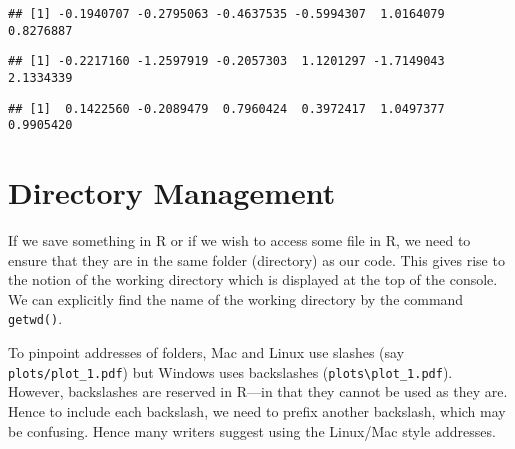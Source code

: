 \documentclass[12pt,]{article}
\newenvironment{Shaded}{\begin{snugshade}}{\end{snugshade}}
\newcommand{\KeywordTok}[1]{\textcolor[rgb]{0.13,0.29,0.53}{\textbf{#1}}}
\newcommand{\DecValTok}[1]{\textcolor[rgb]{0.00,0.00,0.81}{#1}}
\newcommand{\StringTok}[1]{\textcolor[rgb]{0.31,0.60,0.02}{#1}}
\newcommand{\OperatorTok}[1]{\textcolor[rgb]{0.81,0.36,0.00}{\textbf{#1}}}
\newcommand{\NormalTok}[1]{#1}
\begin{document}
\begin{verbatim}
## [1] -0.1940707 -0.2795063 -0.4637535 -0.5994307  1.0164079  0.8276887
\end{verbatim}

\begin{Shaded}
\end{Shaded}

\begin{verbatim}
## [1] -0.2217160 -1.2597919 -0.2057303  1.1201297 -1.7149043  2.1334339
\end{verbatim}

\begin{Shaded}
\end{Shaded}

\begin{verbatim}
## [1]  0.1422560 -0.2089479  0.7960424  0.3972417  1.0497377  0.9905420
\end{verbatim}

\section{Directory Management}\label{directory-management}

If we save something in R or if we wish to access some file in R, we
need to ensure that they are in the same folder (directory) as our code.
This gives rise to the notion of the working directory which is
displayed at the top of the console. We can explicitly find the name of
the working directory by the command \texttt{getwd()}.

To pinpoint addresses of folders, Mac and Linux use slashes (say
\texttt{plots/plot\_1.pdf}) but Windows uses backslashes
(\texttt{plots\textbackslash{}plot\_1.pdf}). However, backslashes are
reserved in R---in that they cannot be used as they are. Hence to
include each backslash, we need to prefix another backslash, which may
be confusing. Hence many writers suggest using the Linux/Mac style
addresses.
\end{document}
